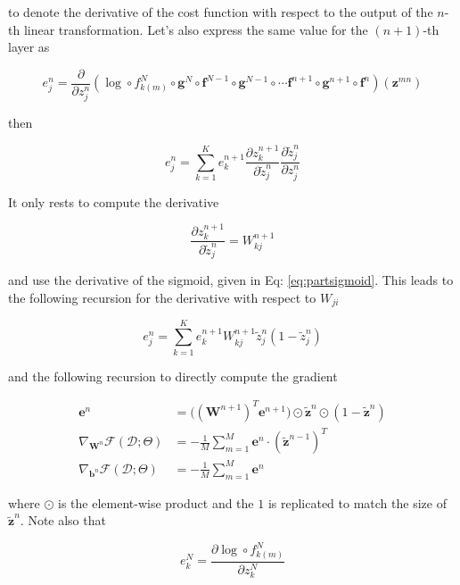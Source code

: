 \noindent to denote the derivative of the cost function with respect to the
output of the $n$-th linear transformation. Let's also express the same value
for the $(n+1)$-th layer as   

\begin{equation}
e^{n}_j = \frac{\partial}{\partial z^{n}_{j}} (\log \circ f_{k(m)}^N \circ \mathbf{g}^N \circ \mathbf{f}^{N-1} \circ \mathbf{g}^{N-1} \circ \cdots \mathbf{f}^{n+1} \circ \mathbf{g}^{n+1} \circ \mathbf{f}^{n})(\mathbf{z}^{mn}) 
\end{equation}

\noindent then

\begin{equation}
e^{n}_j = \sum_{k=1}^K e^{n+1}_k \frac{\partial z^{n+1}_k}{\partial \tilde{z}_{j}^n}\frac{\partial \tilde{z}^n_{j}}{\partial z_{j}^n} 
\end{equation}

\noindent It only rests to compute the derivative

\begin{equation}
\frac{\partial z^{n+1}_k}{\partial \tilde{z}_{j}^n} = W_{kj}^{n+1} 
\end{equation}

\noindent and use the derivative of the sigmoid, given in Eq:
\ref{eq:partsigmoid}. This leads to the following recursion for the derivative
with respect to $W_{ji}$

\begin{equation}
e^{n}_j = \sum_{k=1}^K e^{n+1}_k W_{kj}^{n+1}\tilde{z}^n_{j}(1-\tilde{z}^n_{j})
\end{equation}

\noindent and the following recursion to directly compute the gradient

\begin{align}
\mathbf{e}^{n} & = \Big((\mathbf{W}^{n+1})^T \mathbf{e}^{n+1}\Big) \odot \tilde{\mathbf{z}}^n \odot (1-\tilde{\mathbf{z}}^n)\\
\nabla_{\mathbf{W}^n}\mathcal{F}(\mathcal{D};\Theta) & = -\frac1M \sum_{m=1}^M \mathbf{e}^{n} \cdot \left(\tilde{\mathbf{z}}^{n-1}\right)^T \\ 
\nabla_{\mathbf{b}^n}\mathcal{F}(\mathcal{D};\Theta) & = - \frac1M \sum_{m=1}^M \mathbf{e}^{n}  
\end{align}

\noindent where $\odot$ is the element-wise product and the $1$ is replicated to
match the size of $\tilde{\mathbf{z}}^n$. Note also that 

\begin{equation}
e^N_k = \frac{\partial \log \circ f_{k(m)}^N}{\partial z^{N}_{k}}  
\label{eq:finalError}
\end{equation}

